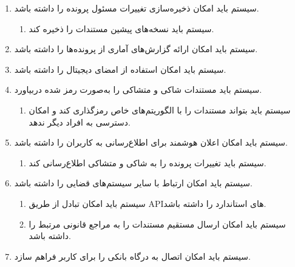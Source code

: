\documentclass[12pt,a4paper,oneside]{article}
\begin{document}
\begin{itemize}
\begin{enumerate}
			\item 
			سیستم باید امکان ذخیره‌سازی تغییرات مسئول پرونده را داشته باشد.
			\begin{enumerate}
				\renewcommand{\labelenumii}{{\rl{\arabic{enumii}.\arabic{enumi}}}R-}
				\item 
				سیستم باید نسخه‌های پیشین مستندات را ذخیره کند.
			\end{enumerate}
	
			\item 
			سیستم باید امکان ارائه گزارش‌های آماری از پرونده‌ها را داشته باشد.
	
			\item 
			سیستم باید امکان استفاده از امضای دیجیتال را داشته باشد.
	
			\item 
			سیستم باید مستندات شاکی و متشاکی را به‌صورت رمز شده دربیاورد.
			\begin{enumerate}
				\renewcommand{\labelenumii}{{\rl{\arabic{enumii}.\arabic{enumi}}}R-}
				\item 
				سیستم باید بتواند مستندات را با الگوریتم‌های خاص رمزگذاری کند و امکان دسترسی به افراد دیگر ندهد.
			\end{enumerate}
	
			\item 
			سیستم باید امکان اعلان هوشمند برای اطلاع‌رسانی به کاربران را داشته باشد.
			\begin{enumerate}
				\renewcommand{\labelenumii}{{\rl{\arabic{enumii}.\arabic{enumi}}}R-}
				\item 
				سیستم باید تغییرات پرونده را به شاکی و متشاکی اطلاع‌رسانی کند.
			\end{enumerate}
	
			\item 
			سیستم باید امکان ارتباط با سایر سیستم‌های قضایی را داشته باشد.
			\begin{enumerate}
				\renewcommand{\labelenumii}{{\rl{\arabic{enumii}.\arabic{enumi}}}R-}
				\item 
				سیستم باید امکان تبادل از طریق APIهای استاندارد را داشته باشد.
				\item 
				سیستم باید امکان ارسال مستقیم مستندات را به مراجع قانونی مرتبط را داشته باشد.
			\end{enumerate}
	
			\item 
			سیستم باید امکان اتصال به درگاه بانکی را برای کاربر فراهم سازد.
		\end{enumerate}
	\end{itemize}
\end{document}
